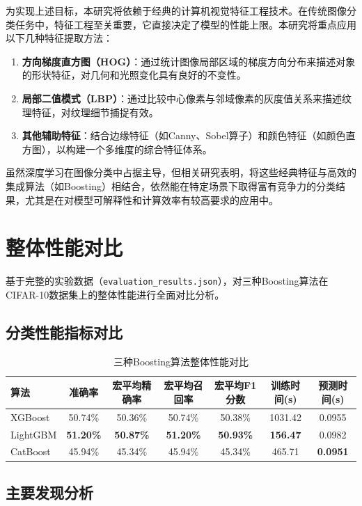 \documentclass[UTF8]{report}
\theoremstyle{MyLineTheoremStyle} %
\theoremstyle{MyBlockTheoremStyle} %
\theoremstyle{MySubsubsectionStyle} %
\begin{document}
为实现上述目标，本研究将依赖于经典的计算机视觉特征工程技术。在传统图像分类任务中，特征工程至关重要，它直接决定了模型的性能上限。本研究将重点应用以下几种特征提取方法：
\begin{enumerate}
    \item \textbf{方向梯度直方图（HOG）}：通过统计图像局部区域的梯度方向分布来描述对象的形状特征，对几何和光照变化具有良好的不变性。
    \item \textbf{局部二值模式（LBP）}：通过比较中心像素与邻域像素的灰度值关系来描述纹理特征，对纹理细节捕捉有效。
    \item \textbf{其他辅助特征}：结合边缘特征（如Canny、Sobel算子）和颜色特征（如颜色直方图），以构建一个多维度的综合特征体系。
\end{enumerate}
虽然深度学习在图像分类中占据主导，但相关研究表明，将这些经典特征与高效的集成算法（如Boosting）相结合，依然能在特定场景下取得富有竞争力的分类结果，尤其是在对模型可解释性和计算效率有较高要求的应用中。






\section{整体性能对比}
基于完整的实验数据（\texttt{evaluation\_results.json}），对三种Boosting算法在CIFAR-10数据集上的整体性能进行全面对比分析。

\subsection{分类性能指标对比}
\begin{table}[H]
    \centering
    \caption{三种Boosting算法整体性能对比}
    \begin{tabular}{lcccccc}
        \toprule
        算法 & 准确率 & 宏平均精确率 & 宏平均召回率 & 宏平均F1分数 & 训练时间(s) & 预测时间(s) \\
        \midrule
        XGBoost & 50.74\% & 50.36\% & 50.74\% & 50.38\% & 1031.42 & 0.0955 \\
        LightGBM & \textbf{51.20\%} & \textbf{50.87\%} & \textbf{51.20\%} & \textbf{50.93\%} & \textbf{156.47} & 0.0982 \\
        CatBoost & 45.94\% & 45.34\% & 45.94\% & 45.34\% & 465.71 & \textbf{0.0951} \\
        \bottomrule
    \end{tabular}
\end{table}

\subsection{主要发现分析}
\end{document}
